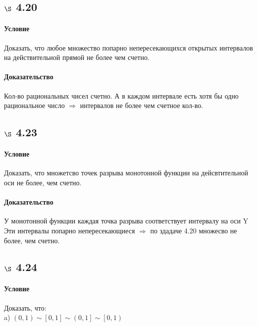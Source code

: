 \documentclass[a4paper,12pt]{article}
\begin{document}
\subsection*{$\S$ 4.20}
\paragraph*{Условие}
Доказать, что любое множество попарно непересекающихся открытых интервалов на действительной прямой не более чем счетно.
\paragraph*{Доказательство}
Кол-во рациональных чисел счетно. А в каждом интервале есть хотя бы одно рациональное число $\Rightarrow$ интервалов не более чем счетное кол-во.

\subsection*{$\S$ 4.23}
\paragraph*{Условие}
Доказать, что множетсво точек разрыва монотонной функции на дейсвтительной оси не более, чем счетно.
\paragraph*{Доказательство}
У монотонной функции каждая точка разрыва соответствует интервалу на оси Y\\
Эти интервалы попарно непересекающиеся $\Rightarrow$ по здадаче 4.20 множесво не более, чем счетно.

\subsection*{$\S$ 4.24}
\paragraph*{Условие}
Доказать, что:\\
a) $\left( 0, 1\right)  \sim \left[  0, 1 \right]  \sim \left(  0, 1 \right]  \sim \left[  0, 1 \right) $\\
\end{document}
